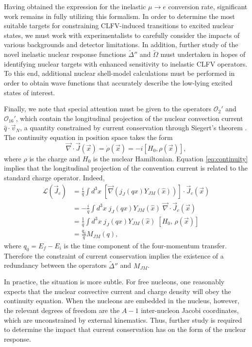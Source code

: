 \documentclass[12pt,letterpaper]{book}
\begin{document}
Having obtained the expression for the inelastic $\mu\rightarrow e$ conversion rate, significant work remains in fully utilizing this formalism. In order to determine the most suitable targets for constraining CLFV-induced transitions to excited nuclear states, we must work with experimentalists to carefully consider the impacts of various backgrounds and detector limitations. In addition, further study of the novel inelastic nuclear response functions $\tilde{\Delta}''$ and $\tilde{\Omega}$ must undertaken in hopes of identifying nuclear targets with enhanced sensitivity to inelastic CLFV operators. To this end, additional nuclear shell-model calculations must be performed in order to obtain wave functions that accurately describe the low-lying excited states of interest. 

Finally, we note that special attention must be given to the operators $\mathcal{O}_2'$ and $\mathcal{O}_{16}'$, which contain the longitudinal projection of the nuclear convection current $\hat{q}\cdot\vec{v}_N$, a quantity constrained by current conservation through Siegert's theorem \cite{PhysRev.52.787}. The continuity equation in position space takes the form
\begin{equation}
\vec{\nabla}\cdot\vec{J}(\vec{x})=\dot{\rho}(\vec{x})=-i\left[H_0,\rho(\vec{x})\right],
\label{eq:continuity}
\end{equation}
where $\rho$ is the charge and $H_0$ is the nuclear Hamiltonian. Equation \ref{eq:continuity} implies that the longitudinal projection of the convention current is related to the standard charge operator. Indeed,
\begin{equation}
\begin{split}
\mathcal{L}(\vec{J}_c)&=\frac{i}{q}\int d^3x\;\left[\vec{\nabla}\left(j_J(qx)Y_{JM}(\hat{x})\right)\right]\cdot\vec{J}_c(\vec{x})\\
&=-\frac{i}{q}\int d^3x\;j_J(qx)Y_{JM}(\hat{x})\;\vec{\nabla}\cdot\vec{J}_c(\vec{x})\\
&=\frac{1}{q}\int d^3x\;j_J(qx)Y_{JM}(\hat{x})\;\left[H_0,\,\rho(\vec{x})\right]\\
&=\frac{q_0}{q}M_{JM}(q),
\end{split}
\end{equation}
where $q_0=E_f-E_i$ is the time component of the four-momentum transfer. Therefore the constraint of current conservation implies the existence of a redundancy between the operators $\tilde{\Delta}''$ and $M_{JM}$. 

In practice, the situation is more subtle. For free nucleons, one reasonably expects that the nuclear convective current and charge density will obey the continuity equation. When the nucleons are embedded in the nucleus, however, the relevant degrees of freedom are the $A-1$ inter-nucleon Jacobi coordinates, which are unconstrained by external kinematics.  Thus, further study is required to determine the impact that current conservation has on the form of the nuclear response.
\end{document}
